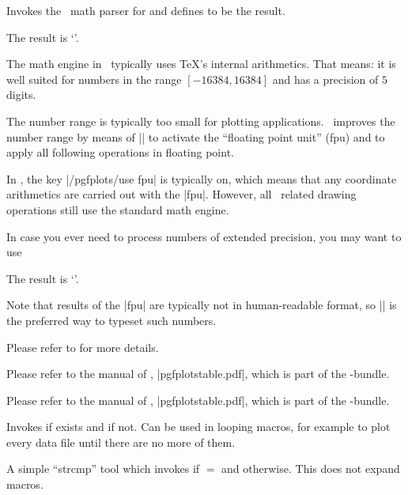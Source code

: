 \begin{command}{\pgfmathparse{}}
	Invokes the \pgfname\ math parser for  and defines \declareandlabel{\pgfmathresult} to be the result.
\begin{codeexample}[]

The result is `\pgfmathresult'.
\end{codeexample}
	\noindent The math engine in \pgfname\ typically uses \TeX's internal arithmetics. That means: it is well suited for numbers in the range $[-16384,16384]$ and has a precision of $5$ digits.

	The number range is typically too small for plotting applications. \PGFPlots\ improves the number range by means of || to activate the ``floating point unit'' (fpu) and to apply all following operations in floating point. 

	In \PGFPlots, the key |/pgfplots/use fpu| is typically on, which means that any coordinate arithmetics are carried out with the |fpu|. However, all \pgfname\ related drawing operations still use the standard math engine.

	In case you ever need to process numbers of extended precision, you may want to use
\begin{codeexample}[]
%

The result is `\pgfmathprintnumber{\pgfmathresult}'.
\end{codeexample}
	Note that results of the |fpu| are typically not in human-readable format, so |\pgfmathprintnumber| is the preferred way to typeset such numbers.

	Please refer to \cite{tikz} for more details.
\end{command}


\begin{command}{\pgfplotstableread{}}
	Please refer to the manual of \PGFPlotstable, |pgfplotstable.pdf|, which is part of the \PGFPlots-bundle.
\end{command}
\begin{command}{\pgfplotstabletypeset{}}
	Please refer to the manual of \PGFPlotstable, |pgfplotstable.pdf|, which is part of the \PGFPlots-bundle.
\end{command}

\begin{command}{\pgfplotsiffileexists{}}
	Invokes  if  exists and  if not. Can be used in looping macros, for example to plot every data file until there are no more of them.
\end{command}
\begin{command}{\pgfplotsutilifstringequal{}}
	A simple ``strcmp'' tool which invokes  if  $=$ and  otherwise. This does not expand macros.
\end{command}


